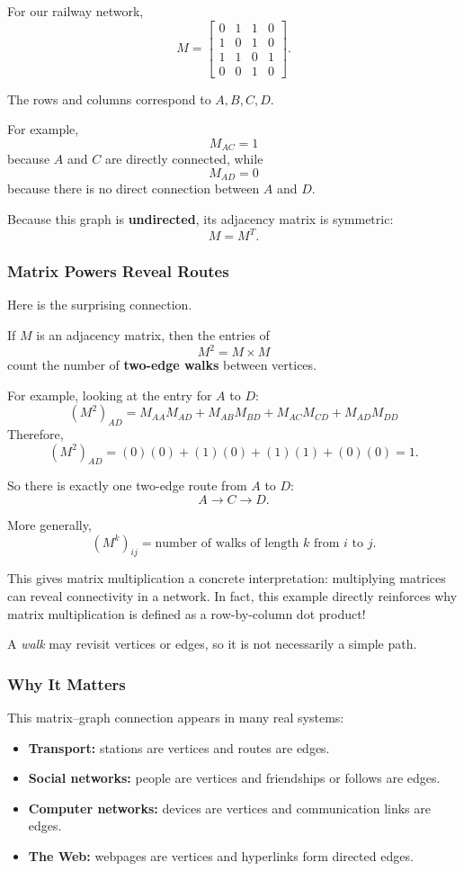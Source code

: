 For our railway network,
\[
M = 
\begin{bmatrix}
0 & 1 & 1 & 0 \\
1 & 0 & 1 & 0 \\
1 & 1 & 0 & 1 \\
0 & 0 & 1 & 0
\end{bmatrix}.
\]

The rows and columns correspond to $A, B, C, D$. 

For example,
\[ M_{AC} = 1 \]
because $A$ and $C$ are directly connected, while
\[ M_{AD} = 0 \]
because there is no direct connection between $A$ and $D$.

Because this graph is \textbf{undirected}, its adjacency matrix is symmetric:
\[ M = M^T. \]

\subsubsection*{Matrix Powers Reveal Routes}

Here is the surprising connection.

If $M$ is an adjacency matrix, then the entries of
\[ M^2 = M \times M \]
count the number of \textbf{two-edge walks} between vertices.

For example, looking at the entry for $A$ to $D$:
\[ (M^2)_{AD} = M_{AA}M_{AD} + M_{AB}M_{BD} + M_{AC}M_{CD} + M_{AD}M_{DD} \]
Therefore,
\[ (M^2)_{AD} = (0)(0) + (1)(0) + (1)(1) + (0)(0) = 1. \]

So there is exactly one two-edge route from $A$ to $D$:
\[ A \rightarrow C \rightarrow D. \]

More generally,
\[ \boxed{ (M^k)_{ij} = \text{number of walks of length } k \text{ from } i \text{ to } j. } \]

This gives matrix multiplication a concrete interpretation: multiplying matrices can reveal connectivity in a network. In fact, this example directly reinforces why matrix multiplication is defined as a row-by-column dot product!

\begin{remark}[Note]
A \emph{walk} may revisit vertices or edges, so it is not necessarily a simple path.
\end{remark}

\subsubsection*{Why It Matters}

This matrix--graph connection appears in many real systems:
\begin{itemize}[leftmargin=*]
    \item \textbf{Transport:} stations are vertices and routes are edges.
    \item \textbf{Social networks:} people are vertices and friendships or follows are edges.
    \item \textbf{Computer networks:} devices are vertices and communication links are edges.
    \item \textbf{The Web:} webpages are vertices and hyperlinks form directed edges.
\end{itemize}

